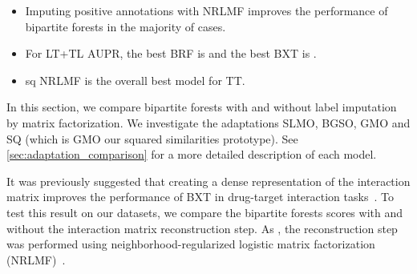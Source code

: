 \begin{mdframed}[frametitle={Key findings}]
    \begin{itemize}
        \item Imputing positive annotations with NRLMF improves the performance of bipartite forests in the majority of cases.
        \item For LT+TL AUPR, the best BRF is  and the best BXT is .
        \item sq NRLMF is the overall best model for TT.
    \end{itemize}
\end{mdframed}

In this section, we compare bipartite forests with and without label imputation by matrix factorization. We investigate the adaptations SLMO, BGSO, GMO and SQ (which is GMO our squared similarities prototype). See \autoref{sec:adaptation_comparison} for a more detailed description of each model.

It was previously suggested that creating a dense representation of the interaction matrix improves the performance of BXT in drug-target interaction tasks~\cite{pliakos2020drugtarget}.
To test this result on our datasets, we compare the bipartite forests scores with and without the interaction matrix reconstruction step. As \cite{pliakos2020drugtarget}, the reconstruction step was performed using neighborhood-regularized logistic matrix factorization (NRLMF)~\cite{liu2016neighborhood}.

